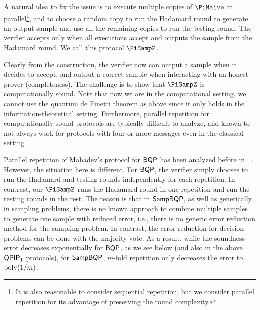  A natural idea to fix the issue is to execute multiple copies of $\PiNaive$ in parallel\footnote{It is also reasonable to consider sequential repetition, but we consider parallel repetition for its advantage of preserving the round complexity.}, and to choose a random copy to run the Hadamard round to generate an output sample and use all the remaining copies to run the testing round. The verifier accepts only when all executions accept and outputs the sample from the Hadamard round. We call this protocol $\PiSampZ$.

Clearly from the construction, the verifier now can output a sample when it decides to accept, and output a correct sample when interacting with an honest prover (completeness). The challenge is to show that $\PiSampZ$ is computationally sound. Note that now we are in the computational setting, we cannot use the quantum de Finetti theorem as above since it only holds in the information-theoretical setting. Furthermore, parallel repetition for computationally sound protocols are typically difficult to analyze, and known to not always work for protocols with four or more messages even in the classical setting~\cite{BIN97,PW12}.


 Parallel repetition of Mahadev's protocol for $\operatorname{\mathsf{BQP}}$ has been analyzed before in ~\cite{arXiv:ChiaChungYam19, arXiv:AlaChiHun19}. However, the situation here is different. 
 For $\operatorname{\mathsf{BQP}}$, the verifier simply chooses to run the Hadamard and testing rounds independently for each repetition. In contrast, our $\PiSampZ$ runs the Hadamard round in one repetition and run the testing rounds in the rest. The reason is that in $\operatorname{\mathsf{SampBQP}}$, as well as generically in sampling problems, there is no known approach to combine multiple samples to generate one sample with reduced error, i.e., there is no generic error reduction method for the sampling problem. 
In contrast, the error reduction for decision problems can be done with the majority vote. 
As a result, while the soundness error decreases exponentially for $\operatorname{\mathsf{BQP}}$, as we see below (and also in the above $\operatorname{\mathsf{QPIP}}_1$ protocols), for $\operatorname{\mathsf{SampBQP}}$, $m$-fold repetition only decreases the error to $\operatorname*{\operatorname{poly}}(1/m)$. 


